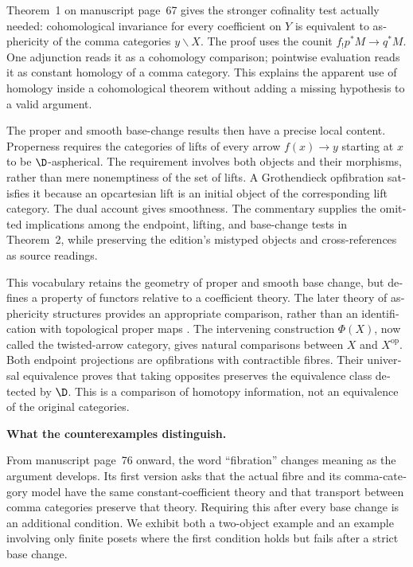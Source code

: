 \begin{otherlanguage}{english}
Theorem~1 on manuscript page~67 gives the stronger cofinality test actually needed: cohomological invariance for every coefficient on $Y$ is equivalent to asphericity of the comma categories $y\backslash X$. The proof uses the counit $f_!p^*M\to q^*M$. One adjunction reads it as a cohomology comparison; pointwise evaluation reads it as constant homology of a comma category. This explains the apparent use of homology inside a cohomological theorem without adding a missing hypothesis to a valid argument.

The proper and smooth base-change results then have a precise local content. Properness requires the categories of lifts of every arrow $f(x)\to y$ starting at $x$ to be $\D$-aspherical. The requirement involves both objects and their morphisms, rather than mere nonemptiness of the set of lifts. A Grothendieck opfibration satisfies it because an opcartesian lift is an initial object of the corresponding lift category. The dual account gives smoothness. The commentary supplies the omitted implications among the endpoint, lifting, and base-change tests in Theorem~2, while preserving the edition's mistyped objects and cross-references as source readings.

This vocabulary retains the geometry of proper and smooth base change, but defines a property of functors relative to a coefficient theory. The later theory of asphericity structures provides an appropriate comparison, rather than an identification with topological proper maps \citep[Theorems~1.2, 4.13, and~5.4]{Maltsiniotis2005Asphericite}. The intervening construction $\Phi(X)$, now called the twisted-arrow category, gives natural comparisons between $X$ and $X^{\mathrm{op}}$. Both endpoint projections are opfibrations with contractible fibres. Their universal equivalence proves that taking opposites preserves the equivalence class detected by $\D$. This is a comparison of homotopy information, not an equivalence of the original categories.

\medskip\noindent\textbf{What the counterexamples distinguish.}

From manuscript page~76 onward, the word ``fibration'' changes meaning as the argument develops. Its first version asks that the actual fibre and its comma-category model have the same constant-coefficient theory and that transport between comma categories preserve that theory. Requiring this after every base change is an additional condition. We exhibit both a two-object example and an example involving only finite posets where the first condition holds but fails after a strict base change.


\end{otherlanguage}
